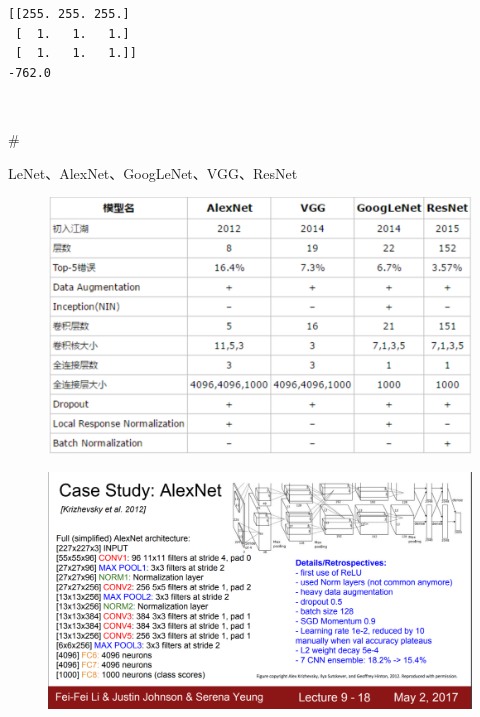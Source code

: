 \documentclass[11pt]{article}
\makeatletter
\def\maxwidth{\ifdim\Gin@nat@width>\linewidth\linewidth
    \else\Gin@nat@width\fi}
\let\Oldincludegraphics\includegraphics
\renewcommand{\includegraphics}[1]{\Oldincludegraphics[width=.8\maxwidth]{#1}}
\makeatother
\begin{document}
    \begin{Verbatim}[commandchars=\\\{\}]
[[255. 255. 255.]
 [  1.   1.   1.]
 [  1.   1.   1.]]
-762.0

    \end{Verbatim}

    \begin{center}
    \end{center}
    { \hspace*{\fill} \\}
    
    \#

LeNet、AlexNet、GoogLeNet、VGG、ResNet

\begin{figure}
\centering
\includegraphics{net比较.png}
\caption{}
\end{figure}

    \begin{figure}
\centering
\includegraphics{alex_net.png}
\caption{}
\end{figure}
\end{document}
